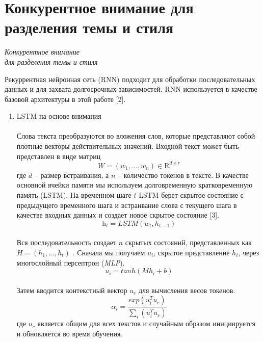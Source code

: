 \documentclass{article}
\begin{document}
\section{Конкурентное внимание для разделения темы и стиля}
\begin{center}
\emph{Конкурентное внимание}\\
\emph{для разделения темы и стиля}
\end{center}
\par Рекуррентная нейронная сеть (RNN) 
подходит для обработки последовательных 
данных и для захвата долгосрочных зависимостей. RNN используется в качестве базовой архитектуры в этой работе [2].
\begin{enumerate}[label={\arabic*)}, left=10pt]
\item LSTM на основе внимания
\paragraph*{} Слова текста преобразуются во вложения слов, которые представляют собой 
плотные векторы действительных значений. Входной текст может быть представлен в виде матриц
\[
\mathit{W} = (w_1, \ldots, w_n) \in \mathds{\mathrm{R}}^{d \times r}
\]
где $d$ – размер встраивания, а $n$ – количество токенов в тексте. В качестве основной 
ячейки памяти мы используем долговременную кратковременную память (LSTM). 
На временном шаге $t$ LSTM берет скрытое 
состояние с предыдущего временного шага 
и встраивание слова с текущего шага в качестве входных данных и создает новое скрытое состояние [3].
\begin{equation}
    \textit{h}_t = \textit{LSTM}(w_t, h_{t-1})
\end{equation}
\paragraph*{} Вся последовательность создает $n$ скрытых состояний, представленных как $\mathit{H} = (h_1, \ldots, h_t)$ . Сначала мы получаем $u_i$, скрытое представление $h_i$, через многослойный персептрон (\textit{MLP}).
\begin{equation}
    \textit{u}_i = tanh (Mh_i+b)
\end{equation}
\paragraph*{}Затем вводится контекстный вектор $u_c$
для вычисления весов токенов.
\begin{equation}
    \alpha_i = \frac{exp(u^T_iu_c)}{\sum_i(u^T_iu_c)}
\end{equation}
где $u_c$ является общим для всех текстов 
и случайным образом инициируется и обновляется во время обучения.

\end{enumerate}
\end{document}
